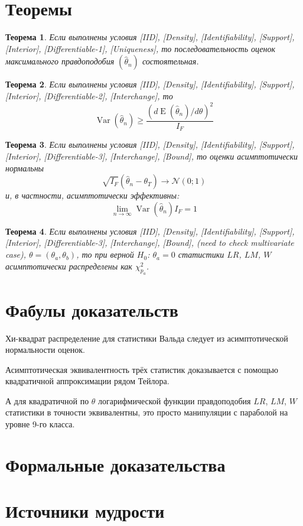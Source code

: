 \documentclass[12pt, a4paper]{article}
\DeclareMathOperator{\Var}{Var}
\DeclareMathOperator{\E}{E}
\newcommand{\cN}{\mathcal{N}}
\newtheorem{theorem}{Теорема}
\begin{document}
\section*{Теоремы}

\begin{theorem}
  Если выполнены условия [IID], [Density], [Identifiability], [Support], [Interior], [Differentiable-1], [Uniqueness], то 
  последовательность оценок максимального правдоподобия $(\hat \theta_n)$ состоятельная. 
\end{theorem}

\begin{theorem}
  Если выполнены условия [IID], [Density], [Identifiability], [Support], [Interior], [Differentiable-2], [Interchange], то 
  \[
  \Var(\hat \theta_n) \geq \frac{(d \E(\hat\theta_n) / d\theta )^2}{I_F}  
  \]
\end{theorem}


\begin{theorem}
  Если выполнены условия [IID], [Density], [Identifiability], [Support], [Interior], [Differentiable-3], [Interchange], [Bound], то
  оценки асимптотически нормальны
  \[
     \sqrt{I_F} (\hat\theta_n - \theta_T) \to \cN(0;1)
  \]
  и, в частности, асимптотически эффективны:
  \[
  \lim_{n\to\infty} \Var(\hat \theta_n) I_F = 1  
  \]
\end{theorem}


\begin{theorem}
  Если выполнены условия [IID], [Density], [Identifiability], [Support], [Interior], [Differentiable-3], [Interchange], [Bound], (need to check multivariate case), $\theta = (\theta_a, \theta_b)$, то 
  при верной $H_0$: $\theta_a = 0$ статистики $LR$, $LM$, $W$ асимптотически распределены как $\chi^2_{p_a}$.
\end{theorem}


\newpage
\section*{Фабулы доказательств}


Хи-квадрат распределение для статистики Вальда следует из асимптотической нормальности оценок. 

Асимптотическая эквивалентность трёх статистик доказывается с помощью квадратичной аппроксимации рядом Тейлора. 

А для квадратичной по $\theta$ логарифмической функции правдоподобия $LR$, $LM$, $W$ статистики в точности эквивалентны, 
это просто манипуляции с параболой на уровне 9-го класса.


\section*{Формальные доказательства}

\section*{Источники мудрости}

\nocite{martin2013maxlik}
\nocite{wood2017generalized}

\printbibliography[heading=none]
\end{document}
